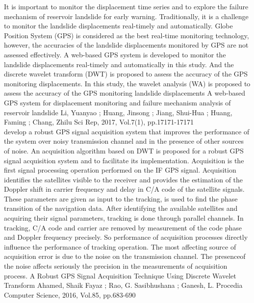 \documentclass[main.tex]{subfiles}
\begin{document}
It is important to monitor the displacement time series and to explore the failure mechanism of reservoir landslide for early warning. Traditionally, it is a challenge to monitor the landslide displacements real-timely and automatically. Globe Position System (GPS) is considered as the best real-time monitoring technology, however, the accuracies of the landslide displacements monitored by GPS are not assessed effectively. A web-based GPS system is developed to monitor the landslide displacements real-timely and automatically in this study. And the discrete wavelet transform (DWT) is proposed to assess the accuracy of the GPS monitoring displacements. In this study, the wavelet analysis (WA) is proposed to assess the accuracy of the GPS monitoring landslide displacements
A web-based GPS system for displacement monitoring and failure mechanism analysis of reservoir landslide
Li, Yuanyao ; Huang, Jinsong ; Jiang, Shui-Hua ; Huang, Faming ; Chang, Zhilu
Sci Rep, 2017, Vol.7(1), pp.17171-17171 \\



develop  a  robust  GPS  signal acquisition  system  that  improves  the  performance  of  the  system  over  noisy  transmission  channel and  in  the  presence  of  other  sources  of  noise.  An  acquisition
  algorithm  based  on  DWT is  proposed  for  a  robust GPS  signal acquisition  system  and  to  facilitate  its  implementation.
Acquisition is the first signal processing operation performed on the IF GPS signal. Acquisition identifies the satellites visible to the receiver and provides the estimation of the Doppler shift in carrier frequency and delay
in C/A code of the satellite signals. These parameters  are  given  as  input  to  the  tracking,  is  used  to  find  the  phase  transition  of  the  navigation  data.  After  identifying the available satellites and acquiring their signal parameters, tracking is done through parallel channels. In tracking, C/A code and carrier are removed by measurement of the code phase and Doppler frequency precisely. So  performance  of  acquisition  processes  directly influence  the  performance  of  tracking  operation.  The  most  affecting source  of  acquisition  error  is  due  to  the  noise  on  the  transmission  channel.  The  presenceof  the  noise  affects seriously the precision in the measurements of acquisition process. 
A Robust GPS Signal Acquisition Technique Using Discrete Wavelet Transform
Ahamed, Shaik Fayaz ; Rao, G. Sasibhushana ; Ganesh, L.
Procedia Computer Science, 2016, Vol.85, pp.683-690 \\
\end{document}
